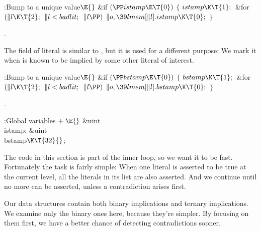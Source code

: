 \Y\B\4:Bump  to a unique value\X${}\E{}$\6
\&{if} ${}(\PP\\{istamp}\E\T{0}){}$\5
${}\{{}$\1\6
${}\\{istamp}\K\T{1};{}$\6
\&{for} ${}(\|l\K\T{2};{}$ ${}\|l<\\{badlit};{}$ ${}\|l\PP){}$\1\5
${}\|o,\39\\{lmem}[\|l].\\{istamp}\K\T{0};{}$\2\6
\4${}\}{}$\2\par
{}.\fi

The  field of literal  is similar to
, but it is used
for a different purpose: We mark it when  is known to be implied
by some other literal of interest.

\Y\B\4:Bump  to a unique value\X${}\E{}$\6
\&{if} ${}(\PP\\{bstamp}\E\T{0}){}$\5
${}\{{}$\1\6
${}\\{bstamp}\K\T{1};{}$\6
\&{for} ${}(\|l\K\T{2};{}$ ${}\|l<\\{badlit};{}$ ${}\|l\PP){}$\1\5
${}\|o,\39\\{lmem}[\|l].\\{bstamp}\K\T{0};{}$\2\6
\4${}\}{}$\2\par
{}.\fi

\B{}:Global variables\X${}\mathrel+\E{}$\6
\&{uint} \\{istamp};\6
\&{uint} \\{bstamp}${}\K\T{32}{}$;\par
\fi

The code in this section is part of the inner loop, so we
want it to be fast.
Fortunately the task is fairly simple: When one literal is asserted to be true
at the current  level, all the literals in its  list
are also asserted. And we continue until no more can be asserted,
unless a contradiction arises first.

Our data structures contain both
binary implications and ternary implications. We examine only
the binary ones here, because they're simpler. By focusing on them first, we
have a better chance of detecting contradictions sooner.

